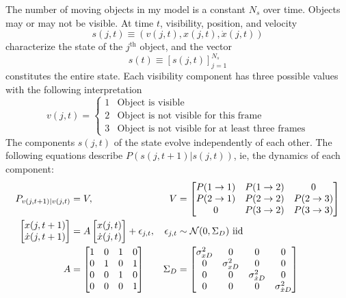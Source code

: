 \documentclass[12pt]{article}
\newcommand{\normal}[2]{{\cal N}(#1,#2)}
\newcommand{\xdot}{{\dot x}}
\renewcommand{\th}{^{\text{th}}}
\newcommand{\ti}[2]{{#1}{(#2)}}                         %
\newcommand{\ts}[4]{{\left[ #1(#2) \right]}_{#3}^{#4}} %
\begin{document}
The number of moving objects in my model is a constant $N_s$ over
time.  Objects may or may not be visible.  At time $t$, visibility,
position, and velocity
\begin{equation*}
  \ti{s}{j,t} \equiv \left(\ti{v}{j,t},\ti{x}{j,t},\ti{\dot x}{j,t} \right)
\end{equation*}
characterize the state of the $j\th$ object, and the vector
\begin{equation*}
  \ti{s}{t} \equiv \ts{s}{j,t}{j=1}{N_s}
\end{equation*}
constitutes the entire state.  Each visibility component has three
possible values with the following interpretation
\begin{equation*}
  \ti{v}{j,t} =
  \begin{cases}
    1 & \text{Object is visible} \\
    2 & \text{Object is not visible for this frame} \\
    3 & \text{Object is not visible for at least three frames}
  \end{cases}
\end{equation*}
The components $\ti{s}{j,t}$ of the state evolve independently of each
other.  The following equations describe
$P(\ti{s}{j,t+1}|\ti{s}{j,t})$, ie, the dynamics of each component:
\begin{subequations}
  \label{eq:dynamics}
  \begin{align}
    P_{\ti{v}{j,t+1}|\ti{v}{j,t}} &= V, & V &=
    \begin{bmatrix}
      P(1 \rightarrow 1) & P(1 \rightarrow 2) & 0 \\
      P(2 \rightarrow 1) & P(2 \rightarrow 2) & P(2 \rightarrow 3) \\
      0 & P(3 \rightarrow 2) & P(3 \rightarrow 3)
    \end{bmatrix} \\
    \begin{bmatrix} \ti{x}{j,t+1} \\ \ti{\xdot}{j,t+1} \end{bmatrix}
    &= A   \begin{bmatrix} \ti{x}{j,t} \\ \ti{\xdot}{j,t} \end{bmatrix}
    + \epsilon_{j,t}, & \epsilon_{j,t} &\sim
    \normal{0}{\Sigma_{D}} \text{ iid} \\
    A &= \begin{bmatrix}
      1 & 0 & 1 & 0 \\
      0 & 1 & 0 & 1 \\
      0 & 0 & 1 & 0 \\
      0 & 0 & 0 & 1
    \end{bmatrix} &
    \Sigma_{D} &= \begin{bmatrix}
      \sigma^2_{xD} & 0 & 0 & 0 \\
      0 & \sigma^2_{xD} & 0 & 0 \\
      0 & 0 & \sigma^2_{\xdot D} & 0 \\
      0 & 0 & 0 & \sigma^2_{\xdot D}
    \end{bmatrix}
  \end{align}
\end{subequations}
\end{document}
